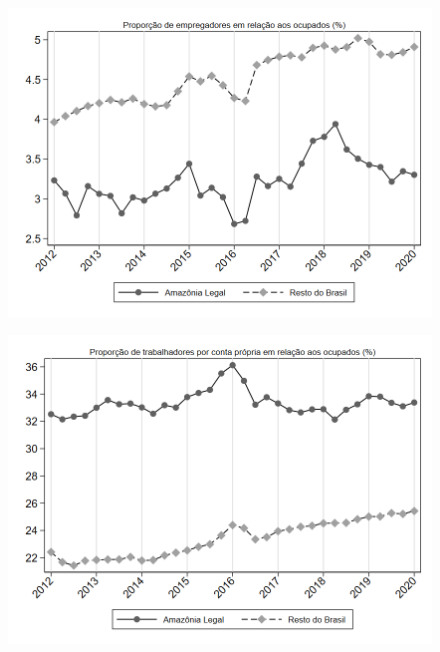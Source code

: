 \begin{frame}[label=_estrutura_emprego_prop_empregador]{}
\textit{\hyperlink{_estrutura_emprego}{}}
\begin{figure}
  \centering
  \includegraphics[width=1.0\linewidth]{../../analysis/output/estrutura_emprego/_estrutura_emprego_prop_empregador.png}
  \caption{}
  \label{fig:_estrutura_emprego_prop_empregador}
\end{figure}
\end{frame}



\begin{frame}[label=_estrutura_emprego_prop_cpropria]{}
\textit{\hyperlink{_estrutura_emprego}{}}
\begin{figure}
  \centering
  \includegraphics[width=1.0\linewidth]{../../analysis/output/estrutura_emprego/_estrutura_emprego_prop_cpropria.png}
  \caption{}
  \label{fig:_estrutura_emprego_prop_cpropria}
\end{figure}
\end{frame}

